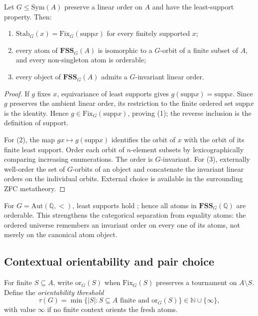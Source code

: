 \documentclass{lmcs}
\newcommand{\Sym}{\mathrm{Sym}}
\newcommand{\Fix}{\mathrm{Fix}}
\newcommand{\supp}{\mathrm{supp}}
\newcommand{\Aut}{\mathrm{Aut}}
\newcommand{\FSS}{\mathbf{FSS}}
\begin{document}
\begin{thm}
\label{thm:totalorder}
Let $G\leq\Sym(A)$ preserve a linear order on $A$ and have the
least-support property. Then:
\begin{enumerate}[label=\textup{(\arabic*)}]
\item $\mathrm{Stab}_G(x)=\Fix_G(\supp x)$ for every finitely supported
$x$;
\item every atom of $\FSS_G(A)$ is isomorphic to a $G$-orbit of a finite
subset of $A$, and every non-singleton atom is orderable;
\item every object of $\FSS_G(A)$ admits a $G$-invariant linear order.
\end{enumerate}
\end{thm}
\begin{proof}
If $g$ fixes $x$, equivariance of least supports gives
$g(\supp x)=\supp x$. Since $g$ preserves the ambient linear order, its
restriction to the finite ordered set $\supp x$ is the identity. Hence
$g\in\Fix_G(\supp x)$, proving (1); the reverse inclusion is the definition
of support.

For (2), the map $gx\mapsto g(\supp x)$ identifies the orbit of $x$ with
the orbit of its finite least support. Order each orbit of $n$-element
subsets by lexicographically comparing increasing enumerations. The order
is $G$-invariant. For (3), externally well-order the set of $G$-orbits of
an object and concatenate the invariant linear orders on the individual
orbits. External choice is available in the surrounding ZFC metatheory.
\end{proof}

For $G=\Aut(\mathbb Q,<)$, least supports hold
\cite[Cor.~9.5]{BKL14}; hence all atoms in
$\FSS_G(\mathbb Q)$ are orderable. This strengthens the categorical
separation from equality atoms: the ordered universe remembers an invariant
order on every one of its atoms, not merely on the canonical atom object.

\subsection{Contextual orientability and pair choice}

\begin{defi}\label{defi:ctxorient}
For finite $S\subseteq A$, write $\mathrm{or}_G(S)$ when
$\Fix_G(S)$ preserves a tournament on $A\setminus S$. Define the
\emph{orientability threshold}
\[
   \tau(G)=\min\{|S|: S\subseteq A\text{ finite and }\mathrm{or}_G(S)\}
   \in\mathbb N\cup\{\infty\},
\]
with value $\infty$ if no finite context orients the fresh atoms.
\end{defi}
\end{document}
